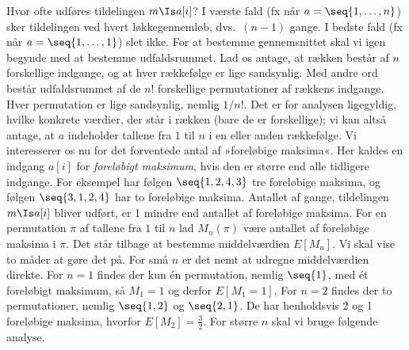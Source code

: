 Hvor ofte udføres tildelingen $m \Is a[i]$?
I værste fald (fx når $a=\seq{1,\ldots, n}$) sker tildelingen ved hvert løkkegennemløb, dvs.\ $(n-1)$ gange.
I bedste fald (fx når $a= \seq{1,\ldots,1}$) slet ikke. 
For at bestemme gennemsnittet skal vi igen begynde med at bestemme udfaldsrummet.
Lad os antage, at rækken består af $n$ forskellige indgange, og at hver rækkefølge er lige sandsynlig.
Med andre ord består udfaldsrummet af de $n!$ forskellige permutationer af rækkens indgange. 
Hver permutation er lige sandsynlig, nemlig $1/n!$.
Det er for analysen ligegyldig, hvilke konkrete værdier, der står i rækken (bare de er forskellige); vi kan altså antage, at $a$ indeholder tallene fra $1$ til $n$ i en eller anden rækkefølge.
Vi interesserer os nu for det forventede antal af »foreløbige maksima«.
Her kaldes en indgang $a[i]$ for \emph{foreløbigt maksimum}, hvis den er større end alle tidligere indgange.
For eksempel har følgen $\seq{1,2,4,3}$ tre foreløbige maksima, og følgen $\seq{3,1,2,4}$ har to foreløbige maksima.
Antallet af gange, tildelingen $m \Is a[i]$ bliver udført, er 1 mindre end antallet af foreløbige maksima.
For en permutation%
$\pi$ af tallene fra $1$ til $n$ lad $M_n(\pi)$ være antallet af foreløbige maksima i $\pi$.
Det står tilbage at bestemme middelværdien $E[M_n]$.
Vi skal vise to måder at gøre det på.
For små $n$ er det nemt at udregne middelværdien direkte.
For $n=1$ findes der kun én permutation, nemlig $\seq{1}$, 
med ét foreløbigt maksimum, så $M_1=1$ og derfor $E[M_1=1]$.
For $n = 2$ findes der to permutationer, nemlig $\seq{1,2}$ og $\seq{2,1}$.
De har henholdsvis 2 og 1 foreløbige maksima, hvorfor $E[M_2] = \frac32$.
For større $n$ skal vi bruge følgende analyse.

